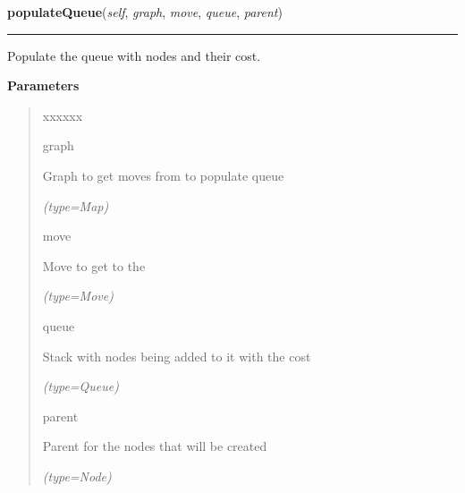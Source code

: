     \vspace{0.5ex}

\hspace{.8\funcindent}\begin{boxedminipage}{\funcwidth}

    \raggedright \textbf{populateQueue}(\textit{self}, \textit{graph}, \textit{move}, \textit{queue}, \textit{parent})

    \vspace{-1.5ex}

    \rule{\textwidth}{0.5\fboxrule}
\setlength{\parskip}{2ex}
    Populate the queue with nodes and their cost.

\setlength{\parskip}{1ex}
      \textbf{Parameters}
      \vspace{-1ex}

      \begin{quote}
        \begin{Ventry}{xxxxxx}

          \item[graph]

          Graph to get moves from to populate queue

            {\it (type=Map)}

          \item[move]

          Move to get to the

            {\it (type=Move)}

          \item[queue]

          Stack with nodes being added to it with the cost

            {\it (type=Queue)}

          \item[parent]

          Parent for the nodes that will be created

            {\it (type=Node)}

        \end{Ventry}

      \end{quote}

    \end{boxedminipage}

    \vspace{0.5ex}

